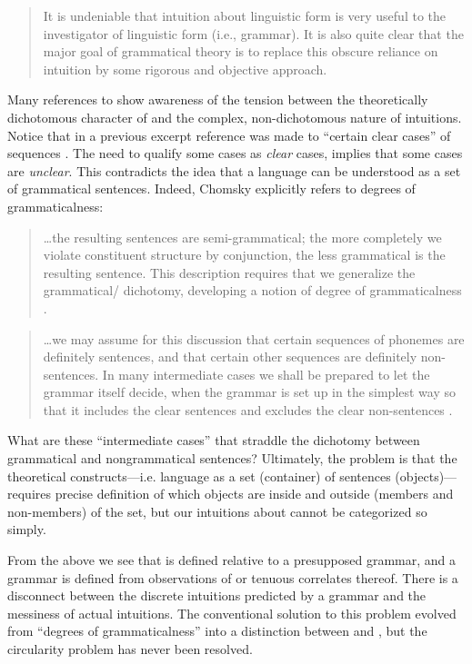 \begin{quote}	
It is undeniable that intuition about linguistic form is very useful to the investigator of linguistic form (i.e., grammar). It is also quite clear that the major goal of grammatical theory is to replace this obscure reliance on intuition by some rigorous and objective approach. \citep[93-94]{Chomsky1957}
\end{quote}

  Many references to  show awareness of the tension between the theoretically dichotomous character of  and the complex, non-dichotomous nature of  intuitions. Notice that in a previous excerpt reference was made to “certain clear cases” of  sequences \citep[113]{Chomsky1956}. The need to qualify some cases as \textit{clear} cases, implies that some cases are \textit{unclear}. This contradicts the idea that a language can be understood as a set of grammatical sentences. Indeed, Chomsky explicitly refers to degrees of grammaticalness: 

\begin{quote}	
…the resulting sentences are semi-grammatical; the more completely we violate constituent structure by conjunction, the less grammatical is the resulting sentence. This description requires that we generalize the grammatical/ dichotomy, developing a notion of degree of grammaticalness \citep[36]{Chomsky1957}.
\end{quote}

\begin{quote}	
…we may assume for this discussion that certain sequences of phonemes are definitely sentences, and that certain other sequences are definitely non-sentences. In many intermediate cases we shall be prepared to let the grammar itself decide, when the grammar is set up in the simplest way so that it includes the clear sentences and excludes the clear non-sentences \citep[14]{Chomsky1957}.
\end{quote}

  What are these “intermediate cases” that straddle the dichotomy between grammatical and nongrammatical sentences? Ultimately, the problem is that the theoretical constructs—i.e. language as a set (container) of sentences (objects)—requires precise definition of which objects are inside and outside (members and non-members) of the set, but our intuitions about  cannot be categorized so simply.

  From the above we see that  is defined relative to a presupposed grammar, and a grammar is defined from observations of  or tenuous correlates thereof. There is a disconnect between the discrete intuitions predicted by a grammar and the messiness of actual intuitions. The conventional solution to this problem evolved from “degrees of grammaticalness” into a distinction between  and , but the circularity problem has never been resolved. 

